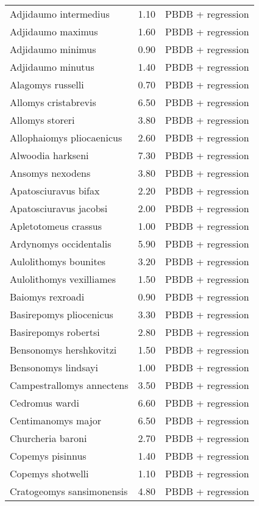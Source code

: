 \begin{table}[ht]
\begin{tabular}{lrl}
  Adjidaumo intermedius & 1.10 & PBDB + regression \\ 
  Adjidaumo maximus & 1.60 & PBDB + regression \\ 
  Adjidaumo minimus & 0.90 & PBDB + regression \\ 
  Adjidaumo minutus & 1.40 & PBDB + regression \\ 
  Alagomys russelli & 0.70 & PBDB + regression \\ 
  Allomys cristabrevis & 6.50 & PBDB + regression \\ 
  Allomys storeri & 3.80 & PBDB + regression \\ 
  Allophaiomys pliocaenicus & 2.60 & PBDB + regression \\ 
  Alwoodia harkseni & 7.30 & PBDB + regression \\ 
  Ansomys nexodens & 3.80 & PBDB + regression \\ 
  Apatosciuravus bifax & 2.20 & PBDB + regression \\ 
  Apatosciuravus jacobsi & 2.00 & PBDB + regression \\ 
  Apletotomeus crassus & 1.00 & PBDB + regression \\ 
  Ardynomys occidentalis & 5.90 & PBDB + regression \\ 
  Aulolithomys bounites & 3.20 & PBDB + regression \\ 
  Aulolithomys vexilliames & 1.50 & PBDB + regression \\ 
  Baiomys rexroadi & 0.90 & PBDB + regression \\ 
  Basirepomys pliocenicus & 3.30 & PBDB + regression \\ 
  Basirepomys robertsi & 2.80 & PBDB + regression \\ 
  Bensonomys hershkovitzi & 1.50 & PBDB + regression \\ 
  Bensonomys lindsayi & 1.00 & PBDB + regression \\ 
  Campestrallomys annectens & 3.50 & PBDB + regression \\ 
  Cedromus wardi & 6.60 & PBDB + regression \\ 
  Centimanomys major & 6.50 & PBDB + regression \\ 
  Churcheria baroni & 2.70 & PBDB + regression \\ 
  Copemys pisinnus & 1.40 & PBDB + regression \\ 
  Copemys shotwelli & 1.10 & PBDB + regression \\ 
  Cratogeomys sansimonensis & 4.80 & PBDB + regression \\ 

\end{tabular}
\end{table}

